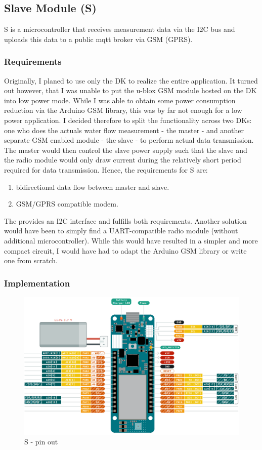 \subsection{\mu Slave Module (\mu S)}

\mu S is a microcontroller that receives measurement data via the I2C bus and uploads this data to a public mqtt broker via
GSM (GPRS).

\subsubsection{Requirements}
Originally, I planed to use only the  \cite{noauthor_arduino_2020} DK to realize the entire application.
It turned out however, that I was unable to put the u-blox GSM module hosted on the DK into low power mode.
While I was able to obtain some power consumption reduction via the Arduino GSM library, this was by far not enough
for a low power application. I decided therefore to split the functionality across two DKs: one who does the actuals water
flow measurement - the master -  and another separate GSM enabled module - the slave -
to perform actual data transmission.
The master would then control the slave power supply such that the slave and the radio module would only draw current
during the relatively short period required for data transmission.
Hence, the requirements for \mu S are:

\begin{enumerate}
    \item bidirectional data flow between master and slave.
    \item GSM/GPRS compatible modem.
\end{enumerate}

The \cite{noauthor_arduino_2020} provides an I2C interface and fulfills both requirements.
Another solution would have been to simply find a UART-compatible radio module (without additional microcontroller).
While this would have resulted in a simpler and more compact circuit, I would have had to adapt the Arduino GSM library or write
one from scratch.

\subsubsection{Implementation}



\clearpage
\begin{figure}[h]
    \centering
    \includegraphics[width=1\textwidth]{SL/uS/uS}
    \caption{\mu S - pin out \cite{noauthor_arduino_2020}}
\end{figure}

\clearpage
